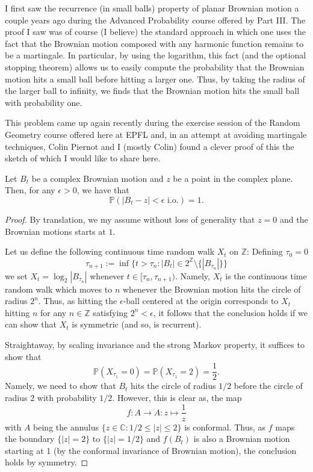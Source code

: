 \documentclass{article}
\begin{document}
I first saw the recurrence (in small balls) property of planar Brownian motion a couple years ago during 
the Advanced Probability course offered by Part III. The proof I saw was of course (I believe) the 
standard approach in which one uses the fact that the Brownian motion composed with any harmonic function 
remains to be a martingale. In particular, by using the logarithm, this fact (and the optional stopping theorem) 
allows us to easily compute the probability that 
the Brownian motion hits a small ball before hitting a larger one. Thus, by taking the radius of the 
larger ball to infinity, we finds that the Brownian motion hits the small ball with probability one. 

This problem came up again recently during the exercise session of the Random Geometry course offered 
here at EPFL and, in an attempt at avoiding martingale techniques, Colin Piernot and I (mostly Colin)
found a clever proof of this the sketch of which I would like to share here. 

\begin{theorem}
  Let \(B_t\) be a complex Brownian motion and \(z\) be a point in the complex plane. Then, for any 
  \(\epsilon > 0\), we have that
  \[\mathbb{P}(|B_t - z| < \epsilon \text{ i.o.}) = 1.\]
\end{theorem}
\begin{proof}
  By translation, we my assume without loss of generality that \(z = 0\) and the Brownian motions 
  starts at \(1\).

  Let us define the following continuous time random walk \(X_t\) on \(\mathbb{Z}\): 
  Defining \(\tau_0 = 0\)
  \[\tau_{n + 1} := \inf\{t > \tau_n : |B_t| \in 2^{\mathbb{Z}} \setminus \{|B_{\tau_n}|\}\}\]
  we set \(X_t = \log_2 |B_{\tau_n}|\) whenever \(t \in [\tau_n, \tau_{n + 1})\). Namely, 
  \(X_t\) is the continuous time random walk which moves to \(n\) whenever the Brownian motion 
  hits the circle of radius \(2^n\). Thus, as hitting the \(\epsilon\)-ball centered at the origin 
  corresponds to \(X_t\) hitting \(n\) for any \(n \in \mathbb{Z}\) satisfying \(2^n < \epsilon\), 
  it follows that the conclusion holds if we can show that \(X_t\) is symmetric (and so, is recurrent). 

  Straightaway, by scaling invariance and the strong Markov property, it suffices to show that 
  \[\mathbb{P}(X_{\tau_1} = 0) = \mathbb{P}(X_{\tau_1} = 2) = \frac{1}{2}.\]
  Namely, we need to show that \(B_t\) hits the circle of radius \(1/2\) before the circle of 
  radius \(2\) with probability \(1/2\).
  However, this is clear as, the map 
  \[f : A \to A : z \mapsto \frac{1}{z}\]
  with \(A\) being the annulus \(\{z \in \mathbb{C} : 1/2 \le |z| \le 2\}\) is conformal. Thus, 
  as \(f\) maps the boundary \(\{|z| = 2\}\) to \(\{|z| = 1/2\}\) and \(f(B_t)\) is also a Brownian 
  motion starting at 1 (by the conformal invariance of Brownian motion), the conclusion holds 
  by symmetry.
\end{proof}
\end{document}

